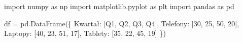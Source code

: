 \documentclass[
  polish,
  letterpaper,
  DIV=11,
  numbers=noendperiod]{scrreprt}
\newenvironment{Shaded}{\begin{snugshade}}{\end{snugshade}}
\newcommand{\DecValTok}[1]{\textcolor[rgb]{0.68,0.00,0.00}{#1}}
\newcommand{\ImportTok}[1]{\textcolor[rgb]{0.00,0.46,0.62}{#1}}
\newcommand{\NormalTok}[1]{\textcolor[rgb]{0.00,0.23,0.31}{#1}}
\newcommand{\OperatorTok}[1]{\textcolor[rgb]{0.37,0.37,0.37}{#1}}
\newcommand{\StringTok}[1]{\textcolor[rgb]{0.13,0.47,0.30}{#1}}
\begin{document}
\begin{Shaded}
\begin{Highlighting}[]
\ImportTok{import}\NormalTok{ numpy }\ImportTok{as}\NormalTok{ np}
\ImportTok{import}\NormalTok{ matplotlib.pyplot }\ImportTok{as}\NormalTok{ plt}
\ImportTok{import}\NormalTok{ pandas }\ImportTok{as}\NormalTok{ pd}

\NormalTok{df }\OperatorTok{=}\NormalTok{ pd.DataFrame(\{}
    \StringTok{\textquotesingle{}Kwartał\textquotesingle{}}\NormalTok{: [}\StringTok{\textquotesingle{}Q1\textquotesingle{}}\NormalTok{, }\StringTok{\textquotesingle{}Q2\textquotesingle{}}\NormalTok{, }\StringTok{\textquotesingle{}Q3\textquotesingle{}}\NormalTok{, }\StringTok{\textquotesingle{}Q4\textquotesingle{}}\NormalTok{],}
    \StringTok{\textquotesingle{}Telefony\textquotesingle{}}\NormalTok{: [}\DecValTok{30}\NormalTok{, }\DecValTok{25}\NormalTok{, }\DecValTok{50}\NormalTok{, }\DecValTok{20}\NormalTok{],}
    \StringTok{\textquotesingle{}Laptopy\textquotesingle{}}\NormalTok{: [}\DecValTok{40}\NormalTok{, }\DecValTok{23}\NormalTok{, }\DecValTok{51}\NormalTok{, }\DecValTok{17}\NormalTok{],}
    \StringTok{\textquotesingle{}Tablety\textquotesingle{}}\NormalTok{: [}\DecValTok{35}\NormalTok{, }\DecValTok{22}\NormalTok{, }\DecValTok{45}\NormalTok{, }\DecValTok{19}\NormalTok{]}
\NormalTok{\})}


\end{Highlighting}
\end{Shaded}
\end{document}
